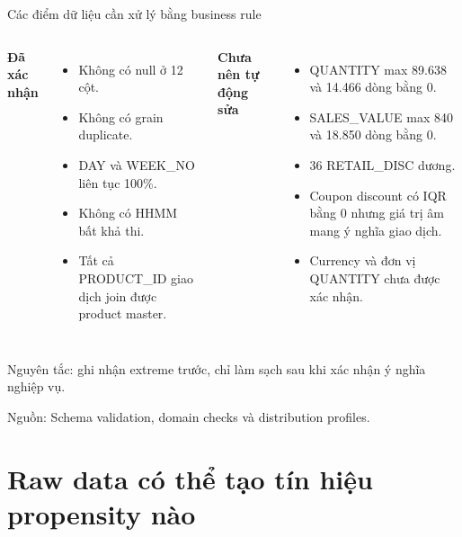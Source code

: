 \documentclass[aspectratio=169,11pt]{beamer}
\newcommand{\src}[1]{\par\vfill{\tiny\color{gray}Nguồn: #1}}
\begin{document}
\begin{frame}{Các điểm dữ liệu cần xử lý bằng business rule}
\begin{columns}[T]
\textbf{Đã xác nhận}
\begin{itemize}
\item Không có null ở 12 cột.
\item Không có grain duplicate.
\item DAY và WEEK\_NO liên tục 100\%.
\item Không có HHMM bất khả thi.
\item Tất cả PRODUCT\_ID giao dịch join được product master.
\end{itemize}
\textbf{Chưa nên tự động sửa}
\begin{itemize}
\item QUANTITY max 89.638 và 14.466 dòng bằng 0.
\item SALES\_VALUE max 840 và 18.850 dòng bằng 0.
\item 36 RETAIL\_DISC dương.
\item Coupon discount có IQR bằng 0 nhưng giá trị âm mang ý nghĩa giao dịch.
\item Currency và đơn vị QUANTITY chưa được xác nhận.
\end{itemize}
\end{columns}
\medskip
\alert{Nguyên tắc:} ghi nhận extreme trước, chỉ làm sạch sau khi xác nhận ý nghĩa nghiệp vụ.
\src{Schema validation, domain checks và distribution profiles.}
\end{frame}

\section{Raw data có thể tạo tín hiệu propensity nào}
\end{document}
